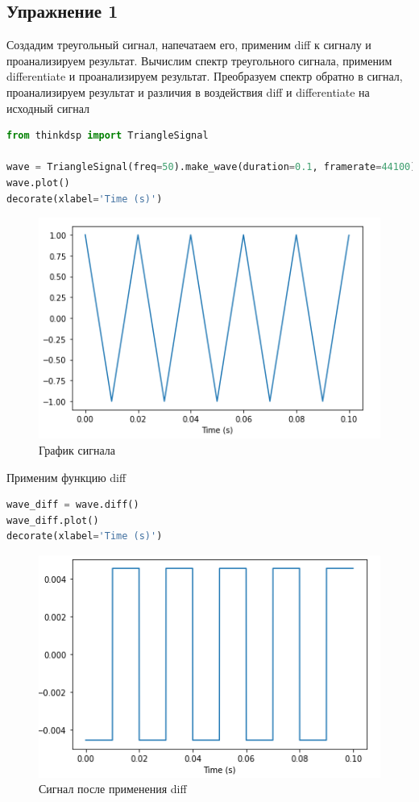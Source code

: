 \subsection{Упражнение 1}

Создадим треугольный сигнал, напечатаем его, применим diff к сигналу и проанализируем результат. Вычислим спектр треугольного сигнала, применим differentiate и проанализируем результат. Преобразуем спектр обратно в сигнал, проанализируем результат и различия в воздействия diff и differentiate на исходный сигнал

\begin{lstlisting}[language=Python]
from thinkdsp import TriangleSignal

wave = TriangleSignal(freq=50).make_wave(duration=0.1, framerate=44100)
wave.plot()
decorate(xlabel='Time (s)')
\end{lstlisting}

\begin{figure}[H]
	\begin{center}
		\includegraphics[scale=1]{fig/lab09/lab09_01.png}
		\caption{График сигнала}
	\end{center}
\end{figure}

Применим функцию diff

\begin{lstlisting}[language=Python]
wave_diff = wave.diff()
wave_diff.plot()
decorate(xlabel='Time (s)')
\end{lstlisting}

\begin{figure}[H]
	\begin{center}
		\includegraphics[scale=1]{fig/lab09/lab09_02.png}
		\caption{Сигнал после применения diff}
	\end{center}
\end{figure}

